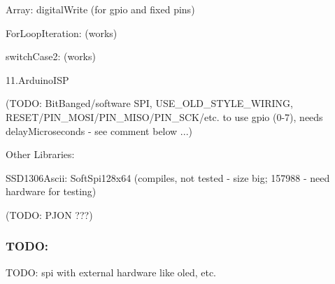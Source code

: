 \begin{DoxyItemize}
\begin{DoxyItemize}
\begin{DoxyItemize}
\item Array\-: digital\-Write (for gpio and fixed pins)
\item For\-Loop\-Iteration\-: (works)
\item switch\-Case2\-: (works)
\end{DoxyItemize}
\item 11.\-Arduino\-I\-S\-P
\begin{DoxyItemize}
\item (T\-O\-D\-O\-: Bit\-Banged/software S\-P\-I, U\-S\-E\-\_\-\-O\-L\-D\-\_\-\-S\-T\-Y\-L\-E\-\_\-\-W\-I\-R\-I\-N\-G, R\-E\-S\-E\-T/\-P\-I\-N\-\_\-\-M\-O\-S\-I/\-P\-I\-N\-\_\-\-M\-I\-S\-O/\-P\-I\-N\-\_\-\-S\-C\-K/etc. to use gpio (0-\/7), needs delay\-Microseconds -\/ see comment below ...)
\end{DoxyItemize}
\item Other Libraries\-:
\begin{DoxyItemize}
\item S\-S\-D1306\-Ascii\-: Soft\-Spi128x64 (compiles, not tested -\/ size big; 157988 -\/ need hardware for testing)
\item (T\-O\-D\-O\-: P\-J\-O\-N ???)
\end{DoxyItemize}
\end{DoxyItemize}
\end{DoxyItemize}

\subsubsection*{T\-O\-D\-O\-:}

T\-O\-D\-O\-: spi with external hardware like oled, etc.

